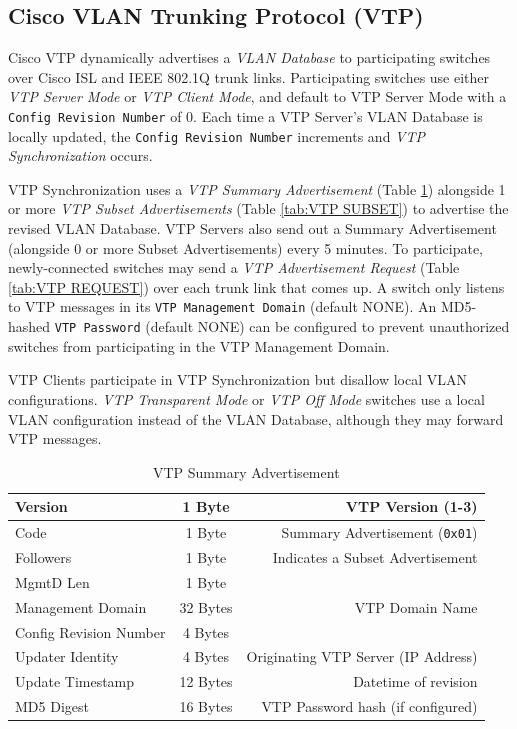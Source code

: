 \documentclass[12pt]{article}
\begin{document}
	\subsection[Cisco VTP]{Cisco VLAN Trunking Protocol (VTP) \label{subsec:CISCO VTP}}
	Cisco VTP dynamically advertises a \textit{VLAN Database} to participating switches over Cisco ISL and IEEE 802.1Q trunk links. Participating switches use either \textit{VTP Server Mode} or \textit{VTP Client Mode}, and default to VTP Server Mode with a \texttt{Config Revision Number} of 0. Each time a VTP Server's VLAN Database is locally updated, the \texttt{Config Revision Number} increments and \textit{VTP Synchronization} occurs.

	VTP Synchronization uses a \textit{VTP Summary Advertisement} (Table \ref{tab:VTP SUMMARY}) alongside 1 or more \textit{VTP Subset Advertisements} (Table \ref{tab:VTP SUBSET}) to advertise the revised VLAN Database. VTP Servers also send out a Summary Advertisement (alongside 0 or more Subset Advertisements) every 5 minutes. To participate, newly-connected switches may send a \textit{VTP Advertisement Request} (Table \ref{tab:VTP REQUEST}) over each trunk link that comes up. A switch only listens to VTP messages in its \texttt{VTP Management Domain} (default NONE). An MD5-hashed \texttt{VTP Password} (default NONE) can be configured to prevent unauthorized switches from participating in the VTP Management Domain.

	VTP Clients participate in VTP Synchronization but disallow local VLAN configurations. \textit{VTP Transparent Mode} or \textit{VTP Off Mode} switches use a local VLAN configuration instead of the VLAN Database, although they may forward VTP messages.

	\begin{table}[H]
	\centering
	\caption{VTP Summary Advertisement \label{tab:VTP SUMMARY}}
	\begin{tabular}{| l | c | r |}
	\hline
	Version				& 1 Byte	& VTP Version (1-3)\\\hline
	Code					& 1 Byte	& Summary Advertisement (\texttt{0x01})\\\hline
	Followers				& 1 Byte	& Indicates a Subset Advertisement\\\hline
	MgmtD Len				& 1 Byte	&\\\hline
	Management Domain		& 32 Bytes	& VTP Domain Name\\\hline
	Config Revision Number	& 4 Bytes	&\\\hline
	Updater Identity			& 4 Bytes	& Originating VTP Server (IP Address)\\\hline
	Update Timestamp		& 12 Bytes	& Datetime of revision\\\hline
	MD5 Digest				& 16 Bytes	& VTP Password hash (if configured)\\\hline
	\end{tabular}\end{table}
\end{document}
